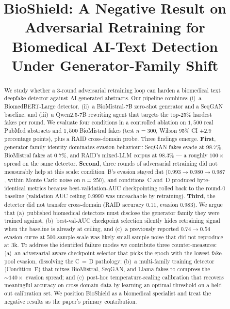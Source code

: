 \documentclass[conference]{IEEEtran}
\begin{document}
\title{BioShield: A Negative Result on Adversarial Retraining for Biomedical AI-Text Detection Under Generator-Family Shift}

\author{
}

\maketitle

\begin{abstract}
We study whether a 3-round adversarial retraining loop can harden a biomedical
text deepfake detector against AI-generated abstracts. Our pipeline combines
(i)~a BiomedBERT-Large detector, (ii)~a BioMistral-7B zero-shot generator and a
SeqGAN baseline, and (iii)~a Qwen2.5-7B rewriting agent that targets the
top-25\% hardest fakes per round. We evaluate four conditions in a controlled
ablation on \(1{,}500\) real PubMed abstracts and \(1{,}500\) BioMistral fakes
(test \(n=300\), Wilson 95\% CI \(\pm 2.9\) percentage points), plus a RAID
cross-domain probe. Three findings emerge. \textbf{First}, generator-family
identity dominates evasion behaviour: SeqGAN fakes evade at \(98.7\%\),
BioMistral fakes at \(0.7\%\), and RAID's mixed-LLM corpus at \(98.3\%\) — a
roughly \(100\times\) spread on the same detector. \textbf{Second}, three
rounds of adversarial retraining did not measurably help at this scale:
condition~B's evasion stayed flat (\(0.993 \to 0.980 \to 0.987\), within Monte
Carlo noise on \(n=250\)), and conditions~C and~D produced byte-identical
metrics because best-validation-AUC checkpointing rolled back to the round-0
baseline (validation AUC ceiling \(0.9990\) was unreachable by retraining).
\textbf{Third}, the detector did not transfer cross-domain (RAID accuracy
\(0.11\), evasion \(0.983\)). We argue that (a)~published biomedical detectors
must disclose the generator family they were trained against, (b)~best-val-AUC
checkpoint selection silently hides retraining signal when the baseline is
already at ceiling, and (c)~a previously reported \(0.74 \to 0.54\) evasion
curve at \(500\)-sample scale was likely small-sample noise that did not
reproduce at \(3\)k. To address the identified failure modes we contribute three counter-measures:
(a)~an adversarial-aware checkpoint selector that picks the epoch with
the lowest fake-pool evasion, dissolving the C\,$=$\,D pathology;
(b)~a multi-family training detector (Condition~E) that mixes BioMistral,
SeqGAN, and Llama fakes to compress the \(\sim\!140\times\) evasion spread;
and (c)~post-hoc temperature-scaling calibration that recovers meaningful
accuracy on cross-domain data by learning an optimal threshold on a
held-out calibration set. We position BioShield as a biomedical specialist
and treat the negative results as the paper's primary contribution.
\end{abstract}
\end{document}

